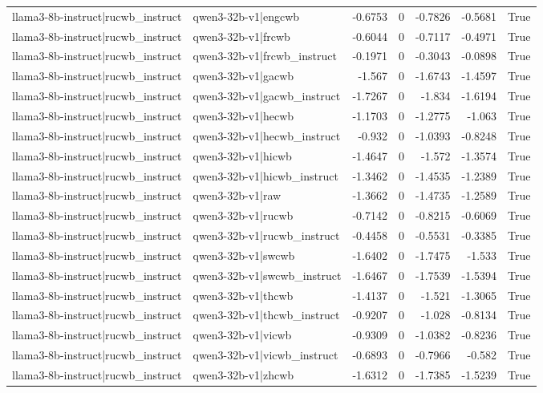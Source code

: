\begin{table}
\begin{tabular}{l l r r r r l}
llama3-8b-instruct|rucwb_instruct & qwen3-32b-v1|engcwb & -0.6753 & 0 & -0.7826 & -0.5681 & True \\
llama3-8b-instruct|rucwb_instruct & qwen3-32b-v1|frcwb & -0.6044 & 0 & -0.7117 & -0.4971 & True \\
llama3-8b-instruct|rucwb_instruct & qwen3-32b-v1|frcwb_instruct & -0.1971 & 0 & -0.3043 & -0.0898 & True \\
llama3-8b-instruct|rucwb_instruct & qwen3-32b-v1|gacwb & -1.567 & 0 & -1.6743 & -1.4597 & True \\
llama3-8b-instruct|rucwb_instruct & qwen3-32b-v1|gacwb_instruct & -1.7267 & 0 & -1.834 & -1.6194 & True \\
llama3-8b-instruct|rucwb_instruct & qwen3-32b-v1|hecwb & -1.1703 & 0 & -1.2775 & -1.063 & True \\
llama3-8b-instruct|rucwb_instruct & qwen3-32b-v1|hecwb_instruct & -0.932 & 0 & -1.0393 & -0.8248 & True \\
llama3-8b-instruct|rucwb_instruct & qwen3-32b-v1|hicwb & -1.4647 & 0 & -1.572 & -1.3574 & True \\
llama3-8b-instruct|rucwb_instruct & qwen3-32b-v1|hicwb_instruct & -1.3462 & 0 & -1.4535 & -1.2389 & True \\
llama3-8b-instruct|rucwb_instruct & qwen3-32b-v1|raw & -1.3662 & 0 & -1.4735 & -1.2589 & True \\
llama3-8b-instruct|rucwb_instruct & qwen3-32b-v1|rucwb & -0.7142 & 0 & -0.8215 & -0.6069 & True \\
llama3-8b-instruct|rucwb_instruct & qwen3-32b-v1|rucwb_instruct & -0.4458 & 0 & -0.5531 & -0.3385 & True \\
llama3-8b-instruct|rucwb_instruct & qwen3-32b-v1|swcwb & -1.6402 & 0 & -1.7475 & -1.533 & True \\
llama3-8b-instruct|rucwb_instruct & qwen3-32b-v1|swcwb_instruct & -1.6467 & 0 & -1.7539 & -1.5394 & True \\
llama3-8b-instruct|rucwb_instruct & qwen3-32b-v1|thcwb & -1.4137 & 0 & -1.521 & -1.3065 & True \\
llama3-8b-instruct|rucwb_instruct & qwen3-32b-v1|thcwb_instruct & -0.9207 & 0 & -1.028 & -0.8134 & True \\
llama3-8b-instruct|rucwb_instruct & qwen3-32b-v1|vicwb & -0.9309 & 0 & -1.0382 & -0.8236 & True \\
llama3-8b-instruct|rucwb_instruct & qwen3-32b-v1|vicwb_instruct & -0.6893 & 0 & -0.7966 & -0.582 & True \\
llama3-8b-instruct|rucwb_instruct & qwen3-32b-v1|zhcwb & -1.6312 & 0 & -1.7385 & -1.5239 & True \\

\end{tabular}
\end{table}
